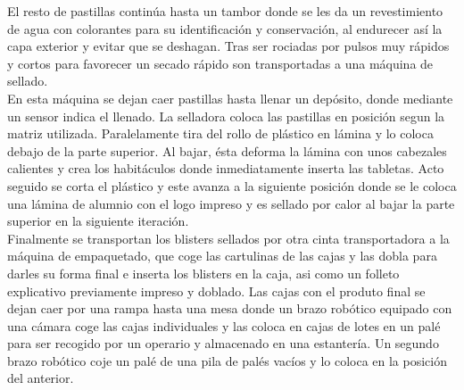 El resto de pastillas continúa hasta un tambor donde se les da un revestimiento de agua con colorantes para su identificación y conservación, al endurecer así la capa exterior y evitar que se deshagan. Tras ser rociadas por pulsos muy rápidos y cortos para favorecer un secado rápido son transportadas a una máquina de sellado.
\\

En esta máquina se dejan caer pastillas hasta llenar un depósito, donde mediante un sensor indica el llenado. La selladora coloca las pastillas en posición segun la matriz utilizada. Paralelamente tira del rollo de plástico en lámina y lo coloca debajo de la parte superior. Al bajar, ésta deforma la lámina con unos cabezales calientes y crea los habitáculos donde inmediatamente inserta las tabletas. Acto seguido se corta el plástico y este avanza a la siguiente posición donde se le coloca una lámina de alumnio con el logo impreso y es sellado por calor al bajar la parte superior en la siguiente iteración. 
\\

Finalmente se transportan los blisters sellados por otra cinta transportadora a la máquina de empaquetado, que coge las cartulinas de las cajas y las dobla para darles su forma final e inserta los blisters en la caja, asi como un folleto explicativo previamente impreso y doblado. Las cajas con el produto final se dejan caer por una rampa hasta una mesa donde un brazo robótico equipado con una cámara coge las cajas individuales y las coloca en cajas de lotes en un palé para ser recogido por un operario y almacenado en una estantería. Un segundo brazo robótico coje un palé de una pila de palés vacíos y lo coloca en la posición del anterior.
\\

